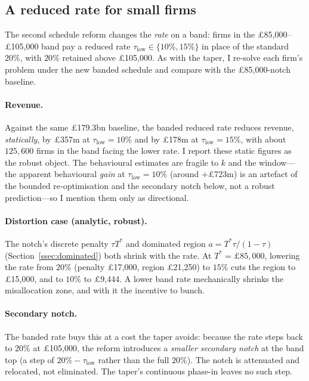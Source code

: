 \subsection{A reduced rate for small firms}
\label{sec:results_rate}

The second schedule reform changes the \emph{rate} on a band: firms in the
\pounds85{,}000--\pounds105{,}000 band pay a reduced rate
$\tau_{\text{low}}\in\{10\%,15\%\}$ in place of the standard $20\%$, with $20\%$
retained above \pounds105{,}000. As with the taper, I re-solve each firm's
problem under the new banded schedule and compare with the \pounds85{,}000-notch
baseline.

\paragraph{Revenue.} Against the same \pounds179.3bn baseline, the banded reduced
rate reduces revenue, \emph{statically}, by \pounds357m at
$\tau_{\text{low}}=10\%$ and by \pounds178m at $\tau_{\text{low}}=15\%$, with
about $125{,}600$ firms in the band facing the lower rate. I report these static
figures as the robust object. The behavioural estimates are fragile to $k$ and the
window---the apparent behavioural \emph{gain} at $\tau_{\text{low}}=10\%$ (around
\(+\)\pounds723m) is an artefact of the bounded re-optimisation and the secondary
notch below, not a robust prediction---so I mention them only as directional.

\paragraph{Distortion case (analytic, robust).} The notch's discrete penalty
$\tau T^{*}$ and dominated region $a=T^{*}\tau/(1-\tau)$
(Section~\ref{ssec:dominated}) both shrink with the rate. At
$T^{*}=\pounds85{,}000$, lowering the rate from $20\%$ (penalty \pounds17{,}000,
region \pounds21{,}250) to $15\%$ cuts the region to \pounds15{,}000, and to
$10\%$ to \pounds9{,}444. A lower band rate mechanically shrinks the misallocation
zone, and with it the incentive to bunch.

\paragraph{Secondary notch.} The banded rate buys this at a cost the taper avoids:
because the rate steps back to $20\%$ at \pounds105{,}000, the reform introduces a
\emph{smaller secondary notch} at the band top (a step of
$20\%-\tau_{\text{low}}$ rather than the full $20\%$). The notch is attenuated and
relocated, not eliminated. The taper's continuous phase-in leaves no such step.

